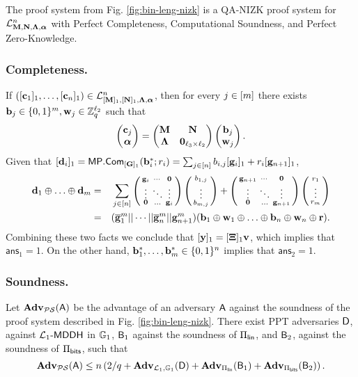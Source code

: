 \begin{theorem}
The proof system from Fig. \ref{fig:bin-leng-nizk} is a QA-NIZK proof system for $\mathcal{L}_{\mathbf{{M}},\mathbf{{N}},\mathbf{{\Lambda}},{\boldsymbol \alpha}}^n$ with Perfect Completeness, Computational Soundness, and Perfect Zero-Knowledge.
\end{theorem}


\subsubsection{Completeness.} If $([\mathbf{c}_1]_1,\ldots,
[\mathbf{{c}}_n]_1) \in\mathcal{L}_{[\mathbf{{M}}]_1,[\mathbf{{N}}]_1,\mathbf{{\Lambda}},{\boldsymbol \alpha}}^n$, then for every $j\in[{m}]$ there exists $\mathbf{{b}}_j\in\{0,1\}^{{m}},\mathbf{{w}}_j \in\mathbb{Z}_q^{{\ell_2}}$ such that 
$$
\left(\begin{matrix}
\mathbf{{c}}_j\\
{\boldsymbol \alpha}
\end{matrix}\right)
=
\begin{pmatrix}
\mathbf{{M}}       & \mathbf{{N}}\\
\mathbf{{\Lambda}} & \mathbf{{0}}_{{\ell_3}\times {\ell_2}}
\end{pmatrix}
\left(\begin{matrix}
    \mathbf{{b}}_j\\
    \mathbf{{w}}_j
\end{matrix}\right).
$$
Given that $[\mathbf{{d}}_i]_1 = \mathsf{MP}.\mathsf{Com}_{[\mathbf{{G}}]_1}(\mathbf{b}_i^*;r_i)=\sum_{j\in[n]}b_{i,j}[\mathbf{g}_i]_1+r_i[\mathbf{g}_{n+1}]_1$,
\begin{eqnarray*}
 \mathbf{d}_1\oplus\ldots\oplus\mathbf{d}_{m}
          &=&  {\sum_{j\in[n]}\left(\begin{smallmatrix}\mathbf{g}_i & \cdots & \mathbf{0}\\\vdots & \ddots & \vdots\\\mathbf{0}& \ldots & \mathbf{g}_i\end{smallmatrix}\right)\left(\begin{smallmatrix}b_{1,j}\\\vdots\\b_{{m},j}\end{smallmatrix}\right)+\left(\begin{smallmatrix}\mathbf{g}_{n+1} & \cdots & \mathbf{0}\\\vdots & \ddots & \vdots\\\mathbf{0}& \ldots & \mathbf{g}_{n+1}\end{smallmatrix}\right)\left(\begin{smallmatrix}r_1\\\vdots\\r_{m}\end{smallmatrix}\right)}\\
         &= & (\overline{\mathbf{g}}_1^{m}||\cdots||\overline{\mathbf{g}}_{n}^{m}||\mathbf{g}_{n+1}^{m})(\mathbf{b}_1\oplus\mathbf{w}_1\oplus\ldots\oplus\mathbf{b}_n\oplus\mathbf{w}_n\oplus\mathbf{r}).
\end{eqnarray*}
Combining these two facts we conclude that
$[\mathbf{y}]_1 = [\mathbf{{\Xi}}]_1 \mathbf{v}$, which implies that $\mathsf{ans}_1=1$. On the other hand, $\mathbf{b}_1^*,\ldots,\mathbf{b}_{m}^*\in\{0,1\}^n$ implies that $\mathsf{ans}_2=1$.
  
\subsubsection{Soundness.}

\begin{theorem}
Let $\mathbf{Adv}_{\mathcal{PS}}(\mathsf{A})$ be the advantage of an adversary $\mathsf{A}$ against the soundness of the proof system described in Fig. \ref{fig:bin-leng-nizk}. There exist PPT adversaries $\mathsf{D}$, against $\mathcal{L}_1\mbox{-}\mathsf{MDDH}$ in $\mathbb{G}_1$, $\mathsf{B}_1$ against the soundness of $\Pi_{\mathsf{lin}}$, and $\mathsf{B}_2$, against the soundness of $\Pi_{\mathsf{bits}}$, such that
$$
\mathbf{Adv}_{\mathcal{PS}}(\mathsf{A})\leq n\left(2/q + \mathbf{Adv}_{\mathcal{L}_1,\mathbb{G}_1}(\mathsf{D})+\mathbf{Adv}_{\Pi_{\mathsf{lin}}}(\mathsf{B}_1)+\mathbf{Adv}_{\Pi_{\mathsf{bits}}}(\mathsf{B}_2)\right).
$$
\end{theorem}

